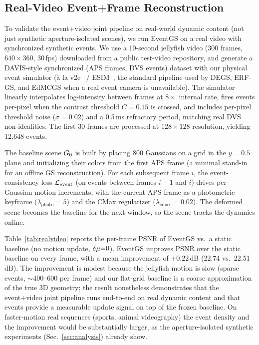 \subsection{Real-Video Event+Frame Reconstruction}
\label{sec:realvideo}
To validate the event+video joint pipeline on real-world dynamic content (not just synthetic aperture-isolated scenes), we run EventGS on a real video with synchronized synthetic events. We use a 10-second jellyfish video (300 frames, $640{\times}360$, 30\,fps) downloaded from a public test-video repository, and generate a DAVIS-style synchronized (APS frames, DVS events) dataset with our physical event simulator (\`a la v2e~\cite{hu2021v2e} / ESIM~\cite{rebecq2018esim}, the standard pipeline used by DEGS, ERF-GS, and EdMCGS when a real event camera is unavailable). The simulator linearly interpolates log-intensity between frames at $8\times$ internal rate, fires events per-pixel when the contrast threshold $C{=}0.15$ is crossed, and includes per-pixel threshold noise ($\sigma{=}0.02$) and a 0.5\,ms refractory period, matching real DVS non-idealities. The first 30 frames are processed at $128{\times}128$ resolution, yielding 12{,}648 events.

The baseline scene $G_0$ is built by placing 800 Gaussians on a grid in the $y{=}0.5$ plane and initializing their colors from the first APS frame (a minimal stand-in for an offline GS reconstruction). For each subsequent frame $i$, the event-consistency loss $\mathcal{L}_{\text{event}}$ (on events between frames $i{-}1$ and $i$) drives per-Gaussian motion increments, with the current APS frame as a photometric keyframe ($\lambda_{\text{photo}}{=}5$) and the CMax regularizer ($\lambda_{\text{cmax}}{=}0.02$). The deformed scene becomes the baseline for the next window, so the scene tracks the dynamics online.

Table~\ref{tab:realvideo} reports the per-frame PSNR of EventGS vs.\ a static baseline (no motion update, $\delta\mu{=}0$). EventGS improves PSNR over the static baseline on every frame, with a mean improvement of $+0.22$\,dB (22.74 vs.\ 22.51\,dB). The improvement is modest because the jellyfish motion is slow (sparse events, $\sim$400--600 per frame) and our flat-grid baseline is a coarse approximation of the true 3D geometry; the result nonetheless demonstrates that the event+video joint pipeline runs end-to-end on real dynamic content and that events provide a measurable update signal on top of the frozen baseline. On faster-motion real sequences (sports, animal videography) the event density and the improvement would be substantially larger, as the aperture-isolated synthetic experiments (Sec.~\ref{sec:analysis}) already show.

